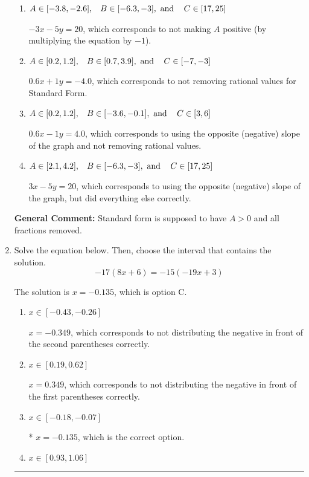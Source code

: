 \documentclass{extbook}[14pt]
\newcommand{\litem}[1]{\item #1

\rule{\textwidth}{0.4pt}}
\begin{document}
\begin{enumerate}
{\begin{enumerate}[label=\Alph*.]
* $3x + 5y = -20$, which is the correct option.
\item \( A \in [-3.8, -2.6], \hspace{3mm} B \in [-6.3, -3], \text{ and } \hspace{3mm} C \in [17, 25] \)

 $-3x - 5y = 20$, which corresponds to not making $A$ positive (by multiplying the equation by $-1$).
\item \( A \in [0.2, 1.2], \hspace{3mm} B \in [0.7, 3.9], \text{ and } \hspace{3mm} C \in [-7, -3] \)

 $0.6x + 1y = -4.0$, which corresponds to not removing rational values for Standard Form.
\item \( A \in [0.2, 1.2], \hspace{3mm} B \in [-3.6, -0.1], \text{ and } \hspace{3mm} C \in [3, 6] \)

 $0.6x - 1y = 4.0$, which corresponds to using the opposite (negative) slope of the graph and not removing rational values.
\item \( A \in [2.1, 4.2], \hspace{3mm} B \in [-6.3, -3], \text{ and } \hspace{3mm} C \in [17, 25] \)

 $3x - 5y = 20$, which corresponds to using the opposite (negative) slope of the graph, but did everything else correctly.
\end{enumerate}

\textbf{General Comment:} Standard form is supposed to have $A > 0$ and all fractions removed.
}
\litem{
Solve the equation below. Then, choose the interval that contains the solution.
\[ -17(8x + 6) = -15(-19x + 3) \]

The solution is \( x = -0.135 \), which is option C.\begin{enumerate}[label=\Alph*.]
\item \( x \in [-0.43, -0.26] \)

$x = -0.349$, which corresponds to not distributing the negative in front of the second parentheses correctly.
\item \( x \in [0.19, 0.62] \)

$x = 0.349$, which corresponds to not distributing the negative in front of the first parentheses correctly.
\item \( x \in [-0.18, -0.07] \)

* $x = -0.135$, which is the correct option.
\item \( x \in [0.93, 1.06] \)


\end{enumerate}}
\end{enumerate}
\end{document}
